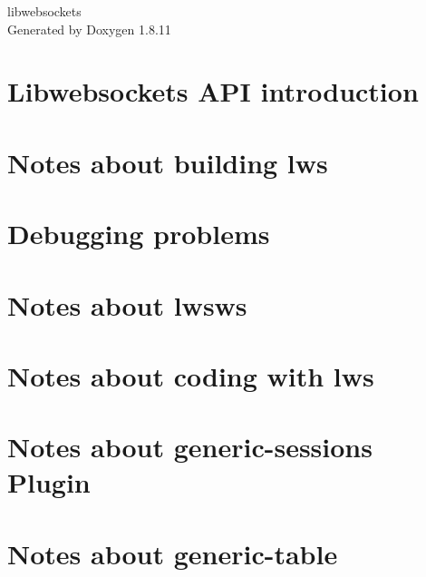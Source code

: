 \documentclass[twoside]{book}
\newcommand{\+}{\discretionary{\mbox{\scriptsize$\hookleftarrow$}}{}{}}
\newcommand{\clearemptydoublepage}{%
  \newpage{\pagestyle{empty}\cleardoublepage}%
}
\begin{document}
\hypersetup{pageanchor=false,
             bookmarksnumbered=true,
             pdfencoding=unicode
            }
\begin{titlepage}
\vspace*{7cm}
\begin{center}%
{\Large libwebsockets }\\
\vspace*{1cm}
{\large Generated by Doxygen 1.8.11}\\
\end{center}
\end{titlepage}
\clearemptydoublepage
\tableofcontents
\clearemptydoublepage
{}
\hypersetup{pageanchor=true}

\chapter{Libwebsockets A\+PI introduction}
\label{index}\hypertarget{index}{}
\chapter{Notes about building lws}
\label{md_README.build}
\hypertarget{md_README.build}{}

\chapter{Debugging problems}
\label{md_README.problems}
\hypertarget{md_README.problems}{}

\chapter{Notes about lwsws}
\label{md_README.lwsws}
\hypertarget{md_README.lwsws}{}

\chapter{Notes about coding with lws}
\label{md_README.coding}
\hypertarget{md_README.coding}{}

\chapter{Notes about generic-\/sessions Plugin}
\label{md_README.generic-sessions}
\hypertarget{md_README.generic-sessions}{}

\chapter{Notes about generic-\/table}
\label{md_README.generic-table}
\hypertarget{md_README.generic-table}{}

\end{document}
